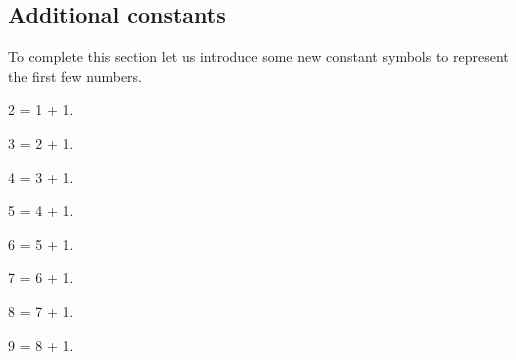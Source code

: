 \subsection{Additional constants}
To complete this section let us introduce some new constant symbols to represent
the first few numbers.

\begin{forthel}
\begin{definition}[0111]
2 = 1 + 1.
\end{definition}

\begin{definition}[0112]
3 = 2 + 1.
\end{definition}

\begin{definition}[0113]
4 = 3 + 1.
\end{definition}

\begin{definition}[0114]
5 = 4 + 1.
\end{definition}

\begin{definition}[0115]
6 = 5 + 1.
\end{definition}

\begin{definition}[0116]
7 = 6 + 1.
\end{definition}

\begin{definition}[0117]
8 = 7 + 1.
\end{definition}

\begin{definition}[0118]
9 = 8 + 1.
\end{definition}
\end{forthel}
